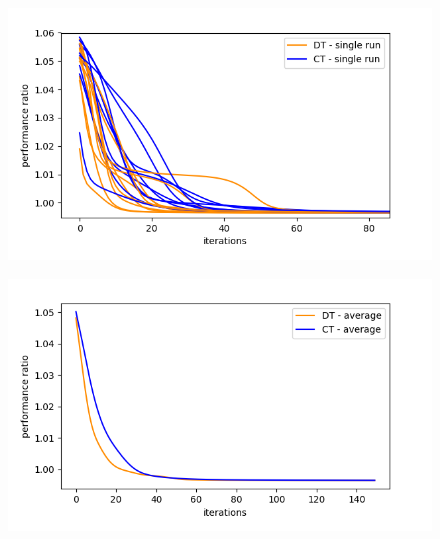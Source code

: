 \documentclass[thesis=M,english]{FITthesis}[2012/10/20]
\begin{document}
\begin{figure}
\centering
\begin{minipage}{1\textwidth}
  \centering
  \includegraphics[width=1\linewidth]{img/ex1/g1.png}
  \label{fig:sr50}
\end{minipage}
\begin{minipage}{1\textwidth}
  \centering
  \includegraphics[width=1\linewidth]{img/ex1/g2.png}
  \label{fig:avgc}
\end{minipage}
\end{figure} 
\end{document}
